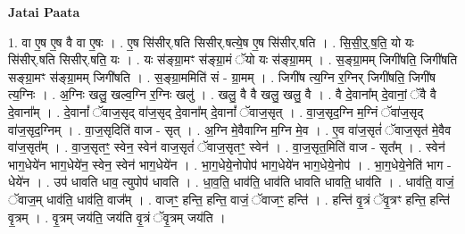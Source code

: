 \documentclass[17pt]{extarticle}
\begin{document}
\textbf{Jatai Paata} \newline

1. वा ए॒ष ए॒ष वै वा ए॒षः । . ए॒ष सि॑सीर्.षति सिसीर्.षत्ये॒ष ए॒ष सि॑सीर्.षति । . सि॒सी॒र्॒.ष॒ति॒ यो यः सि॑सीर्.षति सिसीर्.षति॒ यः । . यः स॑ङ्ग्रा॒मꣳ स॑ङ्ग्रा॒मं ॅयो यः स॑ङ्ग्रा॒मम् । . स॒ङ्ग्रा॒मम् जिगी॑षति॒ जिगी॑षति सङ्ग्रा॒मꣳ स॑ङ्ग्रा॒मम् जिगी॑षति । . स॒ङ्ग्रा॒ममिति॑ सं - ग्रा॒मम् । . जिगी॑ष त्य॒ग्नि र॒ग्निर् जिगी॑षति॒ जिगी॑ष त्य॒ग्निः । . अ॒ग्निः खलु॒ खल्व॒ग्नि र॒ग्निः खलु॑ । . खलु॒ वै वै खलु॒ खलु॒ वै । . वै दे॒वाना᳚म् दे॒वानां॒ ॅवै वै दे॒वाना᳚म् । . दे॒वानां᳚ ॅवाज॒सृद् वा॑ज॒सृद् दे॒वाना᳚म् दे॒वानां᳚ ॅवाज॒सृत् । . वा॒ज॒सृद॒ग्नि म॒ग्निं ॅवा॑ज॒सृद् वा॑ज॒सृद॒ग्निम् । . वा॒ज॒सृदिति॑ वाज - सृत् । . अ॒ग्नि मे॒वैवाग्नि म॒ग्नि मे॒व । . ए॒व वा॑ज॒सृतं॑ ॅवाज॒सृत॑ मे॒वैव वा॑ज॒सृत᳚म् । . वा॒ज॒सृतꣳ॒॒ स्वेन॒ स्वेन॑ वाज॒सृतं॑ ॅवाज॒सृतꣳ॒॒ स्वेन॑ । . वा॒ज॒सृत॒मिति॑ वाज - सृत᳚म् । . स्वेन॑ भाग॒धेये॑न भाग॒धेये॑न॒ स्वेन॒ स्वेन॑ भाग॒धेये॑न । . भा॒ग॒धेये॒नोपोप॑ भाग॒धेये॑न भाग॒धेये॒नोप॑ । . भा॒ग॒धेये॒नेति॑ भाग - धेये॑न । . उप॑ धावति धाव॒ त्युपोप॑ धावति । . धा॒व॒ति॒ धाव॑ति॒ धाव॑ति धावति धावति॒ धाव॑ति । . धाव॑ति॒ वाजं॒ ॅवाज॒म् धाव॑ति॒ धाव॑ति॒ वाज᳚म् । . वाजꣳ॒॒ हन्ति॒ हन्ति॒ वाजं॒ ॅवाजꣳ॒॒ हन्ति॑ । . हन्ति॑ वृ॒त्रं ॅवृ॒त्रꣳ हन्ति॒ हन्ति॑ वृ॒त्रम् । . वृ॒त्रम् जय॑ति॒ जय॑ति वृ॒त्रं ॅवृ॒त्रम् जय॑ति । \newline
\end{document}

